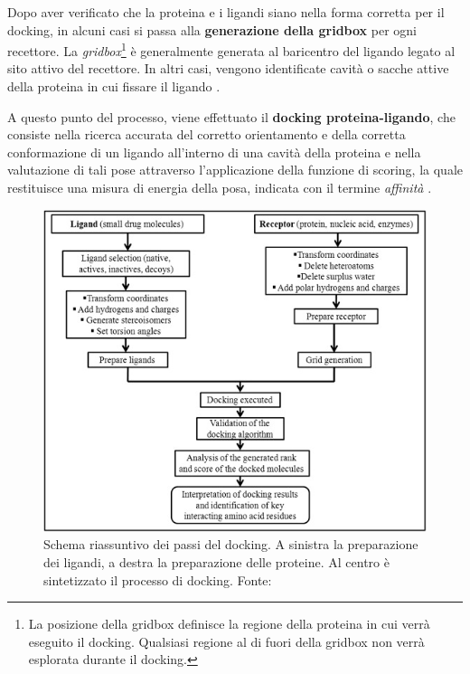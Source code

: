 Dopo aver verificato che la proteina e i ligandi siano nella forma corretta per il docking, in alcuni casi si passa alla \textbf{generazione della gridbox} per ogni recettore. La \textit{gridbox}\footnote{La posizione della gridbox definisce la regione della proteina in cui verrà eseguito il docking. Qualsiasi regione al di fuori della gridbox non verrà esplorata durante il docking.} è generalmente generata al baricentro del ligando legato al sito attivo del recettore. 
In altri casi, vengono identificate cavità o sacche attive della proteina in cui fissare il ligando \cite{roy_chapter_2015}.

A questo punto del processo, viene effettuato il \textbf{docking proteina-ligando}, che consiste nella ricerca accurata del corretto orientamento e della corretta conformazione di un ligando all'interno di una cavità della proteina e nella valutazione di tali pose attraverso l'applicazione della funzione di scoring, la quale restituisce una misura di energia della posa, indicata con il termine \textit{affinità} \cite{roy_chapter_2015}.

\begin{figure}[H]
    \centering
    \includegraphics[scale=0.9]{images/chapter1/docking_steps.jpg}
    \caption[Schema riassuntivo dei passi del docking.]{Schema riassuntivo dei passi del docking. A sinistra la preparazione dei ligandi, a destra la preparazione delle proteine. Al centro è sintetizzato il processo di docking. Fonte: \cite{roy_chapter_2015}}
    \label{fig:docking_steps}
\end{figure}

